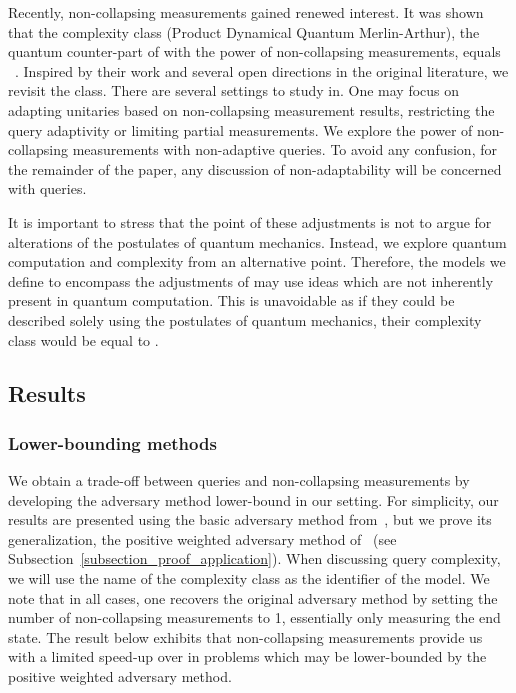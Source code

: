 Recently, non-collapsing measurements gained renewed interest. It was shown that the complexity class  (Product Dynamical Quantum Merlin-Arthur), the quantum counter-part of  with the power of non-collapsing measurements, equals ~\cite{pdqma_equals_nexp, pdqma_single}. Inspired by their work and several open directions in the original \pdqpname literature, we revisit the class. 
There are several settings to study \pdqpname in. One may focus on adapting unitaries based on non-collapsing measurement results, restricting the query adaptivity or limiting partial measurements. We explore the power of non-collapsing measurements with non-adaptive queries. To avoid any confusion, for the remainder of the paper, any discussion of non-adaptability will be concerned with queries.

It is important to stress that the point of these adjustments is not to argue for alterations of the postulates of quantum mechanics. Instead, we explore quantum computation and complexity from an alternative point. Therefore, the models we define to encompass the adjustments of \bqpname may use ideas which are not inherently present in quantum computation. This is unavoidable as if they could be described solely using the postulates of quantum mechanics, their complexity class would be equal to \bqpname.

\subsection{Results}\label{subsection_results}

\subsubsection{Lower-bounding methods}

We obtain a trade-off between queries and non-collapsing measurements by developing the adversary method lower-bound in our setting. For simplicity, our results are presented using the basic adversary method from~\cite{adversary_original}, but we prove its generalization, the positive weighted adversary method of~\cite{weighted_adversary} (see Subsection~\ref{subsection_proof_application}). When discussing query complexity, we will use the name of the complexity class as the identifier of the model. We note that in all cases, one recovers the original adversary method by setting the number of non-collapsing measurements to 1, essentially only measuring the end state. The result below exhibits that non-collapsing measurements provide us with a limited speed-up over \bqpname in problems which may be lower-bounded by the positive weighted adversary method.

